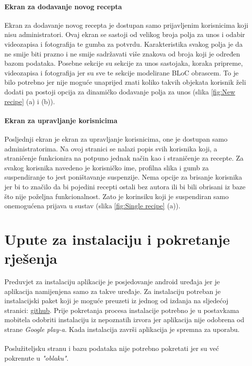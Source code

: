 \documentclass[times, utf8, zavrsni]{fer}
\begin{document}
\subsubsection{Ekran za dodavanje novog recepta}
Ekran za dodavanje novog recepta je dostupan samo prijavljenim korisnicima koji nisu administratori.
Ovaj ekran se sastoji od velikog broja polja za unos i odabir videozapisa i fotografija te gumba za potvrdu.
Karakteristika svakog polja je da ne smije biti prazno i ne smije sadržavati više znakova od broja koji
je određen bazom podataka. Posebne sekcije su sekcije za unos sastojaka, koraka pripreme, videozapisa i
fotografija jer su sve te sekcije modelirane BLoC obrascem. To je bilo potrebno jer nije moguće unaprijed znati koliko
takvih objekata korisnik želi dodati pa postoji opcija za dinamičko dodavanje
polja za unos (slika \ref{fig:New recipe} (a) i (b)).

\subsubsection{Ekran za upravljanje korisnicima}
Posljednji ekran je ekran za upravljanje korisnicima, one je dostupan samo administratorima. Na ovoj stranici se
nalazi popis svih korisnika koji, a straničenje funkcionira na potpuno jednak način kao i straničenje za recepte.
Za svakog korisnika navedeno je korisničko ime, profilna slika i gumb za suspendiranje to jest
poništavanje suspenzije. Nema opcije za brisanje korisnika jer bi to značilo da bi pojedini recepti
ostali bez autora ili bi bili obrisani iz baze što nije poželjna funkcionalnost. Zato je korinsiku koji je suspendiran
samo onemogućena prijava u sustav (slika \ref{fig:Single recipe} (a)).

\chapter{Upute za instalaciju i pokretanje rješenja}
Preduvjet za instalaciju aplikacije je posjedovanje android uređaja jer je aplikacija namijenjena samo
za takve uređaje. Za instalaciju potreban je instalacijski paket koji je moguće preuzeti iz jednog od izdanja
na sljedećoj stranici: \href{https://github.com/MarkoTunjic/Final-BSc-Thesis}{github}. Prije pokretanja
procesa instalacije potrebno je u postavkama mobitela odobriti instalaciju iz nepoznatih izvora jer aplikacija
nije odobrena od strane \textit{Google play-a}. Kada instalacija završi aplikacija je spremna za uporabu.
\\\\
Poslužiteljsku stranu i bazu podataka nije potrebno pokretati jer su već pokrenute u \textit{"oblaku"}.
\end{document}
